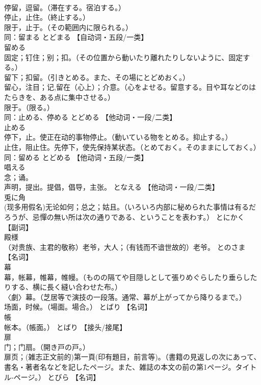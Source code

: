 \documentclass[8pt]{extreport}
\begin{document}
\begin{CJK}{UTF8}{min}
\\	停留，逗留。（滞在する。宿泊する。） 
\\	停止，止住。（終止する。） 
\\	限于，止于。（その範囲内に限られる。） 
\\	同：留まる	とどまる		【自动词・五段/一类】
\\	留める	
\\	固定；钉住；别；扣。（その位置から動いたり離れたりしないように、固定する。） 
\\	留下；扣留。（引きとめる。また、その場にとどめおく。） 
\\	留心，注目；记,留在（心上）；介意。（心をよせる。留意する。目や耳などのはたらきを、ある点に集中させる。） 
\\	限于。（限る。） 
\\	同：止める、停める	とどめる		【他动词・一段/二类】
\\	止める	
\\	停下，止。使正在动的事物停止。（動いている物をとめる。抑止する。） 
\\	止住，阻止住。先停下，使先保持某状态。（とめておく。そのままにしておく。） 
\\	同：留める	とどめる		【他动词・五段/一类】
\\	唱える	
\\	念；诵。 
\\	声明，提出。提倡，倡导，主张。	となえる		【他动词・一段/二类】
\\	兎に角	
\\	(现多用假名)无论如何；总之；姑且。（いろいろ内部に秘められた事情は有るだろうが、忌憚の無い所は次の通りである、ということを表わす。）	とにかく		【副词】
\\	殿様	
\\	（对贵族、主君的敬称）老爷，大人；（有钱而不谙世故的）老爷。	とのさま		【名词】
\\	幕	
\\	幕，帐幕，帷幕，帷幔。（ものの隔てや目隠しとして張りめぐらしたり垂らしたりする、横に長く縫い合わせた布。） 
\\	〈劇〉幕。（芝居等で演技の一段落。通常、幕が上がってから降りるまで。） 
\\	场面，时候。（場面。場合。）	とばり		【名词】
\\	帳	
\\	帐本。（帳面。）	とばり		【接头/接尾】
\\	扉	
\\	门；门扇。（開き戸の戸。） 
\\	扉页；(雑志正文前的)第一頁(印有題目，前言等)。（書籍の見返しの次にあって、書名・著者名などを記したページ。また、雑誌の本文の前の第1ページ。タイトル‐ページ。）	とびら		【名词】

\end{CJK}
\end{document}
